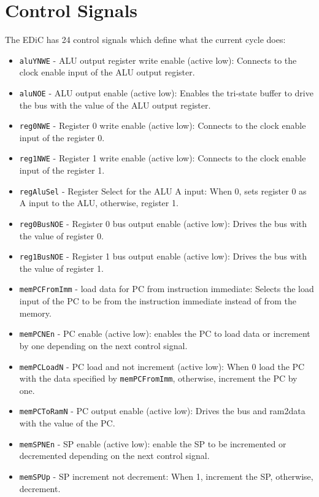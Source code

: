 \section{Control Signals}\label{sec:controlSignals}
The \gls{EDiC} has 24 control signals which define what the current cycle does:
\begin{itemize}
  \item \texttt{aluYNWE} - \gls{ALU} output register write enable (active low): Connects to the clock enable input of the \gls{ALU} output register.
  \item \texttt{aluNOE} - \gls{ALU} output enable (active low): Enables the tri-state buffer to drive the bus with the value of the \gls{ALU} output register.
  \item \texttt{reg0NWE} - Register 0 write enable (active low): Connects to the clock enable input of the register 0.
  \item \texttt{reg1NWE} - Register 1 write enable (active low): Connects to the clock enable input of the register 1.
  \item \texttt{regAluSel} - Register Select for the \gls{ALU} A input: When 0, sets register 0 as A input to the \gls{ALU}, otherwise, register 1.
  \item \texttt{reg0BusNOE} - Register 0 bus output enable (active low): Drives the bus with the value of register 0.
  \item \texttt{reg1BusNOE} - Register 1 bus output enable (active low): Drives the bus with the value of register 1.
  \item \texttt{memPCFromImm} - load data for \gls{PC} from instruction immediate: Selects the load input of the \gls{PC} to be from the instruction immediate instead of from the memory.
  \item \texttt{memPCNEn} - \gls{PC} enable (active low): enables the \gls{PC} to load data or increment by one depending on the next control signal.
  \item \texttt{memPCLoadN} - \gls{PC} load and not increment (active low): When 0 load the \gls{PC} with the data specified by \texttt{memPCFromImm}, otherwise, increment the \gls{PC} by one.
  \item \texttt{memPCToRamN} - \gls{PC} output enable (active low): Drives the bus and ram2data with the value of the \gls{PC}.
  \item \texttt{memSPNEn} - \gls{SP} enable (active low): enable the \gls{SP} to be incremented or decremented depending on the next control signal.
  \item \texttt{memSPUp} - \gls{SP} increment not decrement: When 1, increment the \gls{SP}, otherwise, decrement.

\end{itemize}
